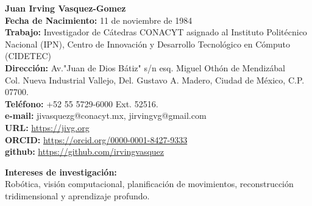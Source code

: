 \documentclass[10pt]{article}
\begin{document}
\begin{center}
{\bf {\Large Juan Irving Vasquez-Gomez}}
\vspace{0.5cm}
\\
\textbf{Fecha de Nacimiento:} 11 de noviembre de 1984 \\
\textbf{Trabajo:} Investigador de Cátedras CONACYT asignado al Instituto Politécnico Nacional (IPN), Centro de Innovación y Desarrollo Tecnológico en Cómputo (CIDETEC) \\ 
\textbf{Dirección:} Av."Juan de Dios Bátiz" s/n esq. Miguel Othón de Mendizábal \\
 Col. Nueva Industrial Vallejo, Del. Gustavo A. Madero, Ciudad de México, C.P. 07700. \\
\textbf{Teléfono:} +52 55 5729-6000 Ext. 52516. \\
\textbf{e-mail:} jivasquezg@conacyt.mx, jirvingvg@gmail.com\\
\textbf{URL:} \url{https://jivg.org} \\
\textbf{ORCID:} \url{https://orcid.org/0000-0001-8427-9333} \\
\textbf{github:} \url{https://github.com/irvingvasquez}

\end{center}

\begin{center}
{\bf Intereses de investigación:} \\ Robótica, visión computacional, planificación de movimientos, reconstrucción tridimensional y aprendizaje profundo.
\end{center}
\end{document}
